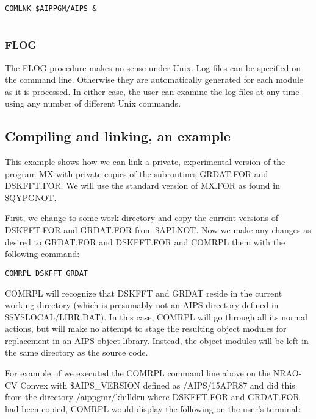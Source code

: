 \begin{verbatim}
COMLNK $AIPPGM/AIPS &


\end{verbatim}

\subsubsection{FLOG}
The FLOG procedure makes no sense under Unix.  Log files can be
specified on the command line.  Otherwise they are automatically
generated for each module as it is processed.  In either case, the
user can examine the log files at any time using any number of
different Unix commands.

\subsection{Compiling and linking, an example}


This example shows how we can link a private, experimental version of
the program MX with private copies of the subroutines GRDAT.FOR and
DSKFFT.FOR.  We will use the standard version of MX.FOR as found in
\$QYPGNOT.

First, we change to some work directory and copy the current versions
of DSKFFT.FOR and GRDAT.FOR from \$APLNOT.  Now we make any changes as
desired to GRDAT.FOR and DSKFFT.FOR and COMRPL them with the following
command:

\begin{verbatim}
COMRPL DSKFFT GRDAT

\end{verbatim}
COMRPL will recognize that DSKFFT and GRDAT reside in the current
working directory (which is presumably not an AIPS directory defined
in \$SYSLOCAL/LIBR.DAT).  In this case, COMRPL will go through all its
normal actions, but will make no attempt to stage the resulting object
modules for replacement in an AIPS object library.  Instead, the
object modules will be left in the same directory as the source code.

For example, if we executed the COMRPL command line above on the
NRAO-CV Convex with \$AIPS\_VERSION defined as /AIPS/15APR87 and did
this from the directory /aippgmr/khilldru where DSKFFT.FOR and
GRDAT.FOR had been copied, COMRPL would display the following on the
user's terminal:

